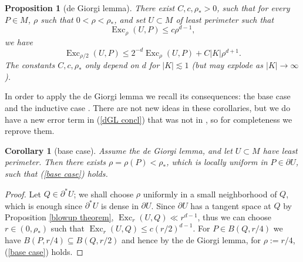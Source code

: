 \documentclass[reqno,11pt]{amsart}
\DeclareMathOperator{\Exc}{Exc}
\newtheorem{proposition}[theorem]{Proposition}
\newtheorem{corollary}[theorem]{Corollary}
\theoremstyle{definition}
\numberwithin{equation}{section}
\begin{document}
\begin{proposition}[de Giorgi lemma]\label{de Giorgi}
There exist $C, c, \rho_* > 0$, such that for every $P \in M$, $\rho$ such that $0 < \rho < \rho_*$, and set $U \subset M$ of least perimeter such that
\begin{equation}\label{base case}
\Exc_\rho(U, P) \leq c\rho^{d - 1},
\end{equation}
we have
\begin{equation}\label{dGL concl}
\Exc_{\rho/2}(U, P) \leq 2^{-d} \Exc_\rho(U, P) + C|K|\rho^{d + 1}.
\end{equation}
The constants $C, c, \rho_*$ only depend on $d$ for $|K| \lesssim 1$ (but may explode as $|K| \to \infty$).
\end{proposition}

In order to apply the de Giorgi lemma we recall its consequences: the base case \cite[pg109]{Giusti77} and the inductive case \cite[Corollary 8.3]{Giusti77}.
There are not new ideas in these corollaries, but we do have a new error term in (\ref{dGL concl}) that was not in \cite[Theorem 8.1]{Giusti77}, so for completeness we reprove them.

\begin{corollary}[base case]
Assume the de Giorgi lemma, and let $U \subset M$ have least perimeter.
Then there exists $\rho = \rho(P) < \rho_*$, which is locally uniform in $P \in \partial U$, such that (\ref{base case}) holds.
\end{corollary}
\begin{proof}
Let $Q \in \partial^* U$; we shall choose $\rho$ uniformly in a small neighborhood of $Q$, which is enough since $\partial^* U$ is dense in $\partial U$.
Since $\partial U$ has a tangent space at $Q$ by Proposition \ref{blowup theorem}, $\Exc_r(U, Q) \ll r^{d - 1}$, thus we can choose $r \in (0, \rho_*)$ such that $\Exc_r(U, Q) \leq c(r/2)^{d - 1}$.
For $P \in B(Q, r/4)$ we have $B(P, r/4) \subseteq B(Q, r/2)$ and hence by the de Giorgi lemma, for $\rho := r/4$, (\ref{base case}) holds.
\end{proof}
\end{document}

